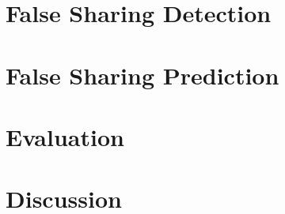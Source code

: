 \section{False Sharing Detection}


\section{False Sharing Prediction}


\section{Evaluation}


\section{Discussion}


